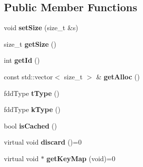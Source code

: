\subsection*{Public Member Functions}
\begin{DoxyCompactItemize}
\item 
\hypertarget{classfaster_1_1fddBase_a41699519e9774d380bd0053f3d3b995a}{}void {\bfseries set\+Size} (size\+\_\+t \&s)\label{classfaster_1_1fddBase_a41699519e9774d380bd0053f3d3b995a}

\item 
\hypertarget{classfaster_1_1fddBase_ab9645c31245a53f97449446a440adf47}{}size\+\_\+t {\bfseries get\+Size} ()\label{classfaster_1_1fddBase_ab9645c31245a53f97449446a440adf47}

\item 
\hypertarget{classfaster_1_1fddBase_a3902296c393cb15e830c02555a0f371f}{}int {\bfseries get\+Id} ()\label{classfaster_1_1fddBase_a3902296c393cb15e830c02555a0f371f}

\item 
\hypertarget{classfaster_1_1fddBase_a2b6f4b4fa670e90cde938d456e5da3b7}{}const std\+::vector$<$ size\+\_\+t $>$ \& {\bfseries get\+Alloc} ()\label{classfaster_1_1fddBase_a2b6f4b4fa670e90cde938d456e5da3b7}

\item 
\hypertarget{classfaster_1_1fddBase_a640157513b4752863e877391de92ede4}{}fdd\+Type {\bfseries t\+Type} ()\label{classfaster_1_1fddBase_a640157513b4752863e877391de92ede4}

\item 
\hypertarget{classfaster_1_1fddBase_a18c8bafa38afa84895db3c27c0416187}{}fdd\+Type {\bfseries k\+Type} ()\label{classfaster_1_1fddBase_a18c8bafa38afa84895db3c27c0416187}

\item 
\hypertarget{classfaster_1_1fddBase_ae2b4fdf3a1e7ac336b21f5e197dfb4a7}{}bool {\bfseries is\+Cached} ()\label{classfaster_1_1fddBase_ae2b4fdf3a1e7ac336b21f5e197dfb4a7}

\item 
\hypertarget{classfaster_1_1fddBase_a4cbed7c20357b0732414af58a9d60380}{}virtual void {\bfseries discard} ()=0\label{classfaster_1_1fddBase_a4cbed7c20357b0732414af58a9d60380}

\item 
\hypertarget{classfaster_1_1fddBase_a63b8a060663ac590bc83fa676fef74f4}{}virtual void $\ast$ {\bfseries get\+Key\+Map} (void)=0\label{classfaster_1_1fddBase_a63b8a060663ac590bc83fa676fef74f4}


\end{DoxyCompactItemize}
